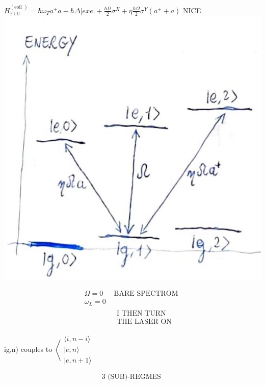\documentclass[10pt]{article}
\begin{document}
$H_{\text {FUll }}^{(\text {eoil })}=\hbar \omega_{T} a^{+} a-\hbar \Delta|e x e|+\frac{\hbar \Omega}{2} \sigma^{X}+\eta \frac{\hbar \Omega}{2} \sigma^{Y}\left(a^{+}+a\right)$ NICE\\
\includegraphics[max width=\textwidth, center]{2025_10_16_9146de9f5ba4f09535e7g-4(1)}

$$
\begin{array}{|lr}
\hline \Omega=0 & \text { BARE SPECTROM } \\
\hline \omega_{L}=0 & \\
& \begin{array}{l}
\text { I THEN TURN } \\
\text { THE LASER ON }
\end{array}
\end{array}
$$

ig,n) couples to $\left\langle\begin{array}{l}\langle i, n-i\rangle \\ |e, n\rangle \\ |e, n+1\rangle\end{array}\right.$

$$
3 \text { (SUB)-REGMES }
$$
\end{document}
